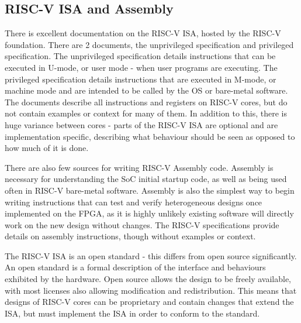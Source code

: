 \subsection{RISC-V ISA and Assembly}
There is excellent documentation on the RISC-V ISA, hosted by the RISC-V foundation. There are 2 documents, the unprivileged specification\cite{riscv-1} and privileged specification\cite{riscv-2}. The unprivileged specification details instructions that can be executed in U-mode, or user mode - when user programs are executing. The privileged specification details instructions that are executed in M-mode, or machine mode and are intended to be called by the OS or bare-metal software. The documents describe all instructions and registers on RISC-V cores, but do not contain examples or context for many of them. In addition to this, there is huge variance between cores - parts of the RISC-V ISA are optional and are implementation specific, describing what behaviour should be seen as opposed to how much of it is done.

There are also few sources for writing RISC-V Assembly code. Assembly is necessary for understanding the SoC initial startup code, as well as being used often in RISC-V bare-metal software. Assembly is also the simplest way to begin writing instructions that can test and verify heterogeneous designs once implemented on the FPGA, as it is highly unlikely existing software will directly work on the new design without changes. The RISC-V specifications provide details on assembly instructions, though without examples or context.

The RISC-V ISA is an open standard - this differs from open source significantly. An open standard is a formal description of the interface and behaviours exhibited by the hardware. Open source allows the design to be freely available, with most licenses also allowing modification and redistribution. This means that designs of RISC-V cores can be proprietary and contain changes that extend the ISA, but must implement the ISA in order to conform to the standard.